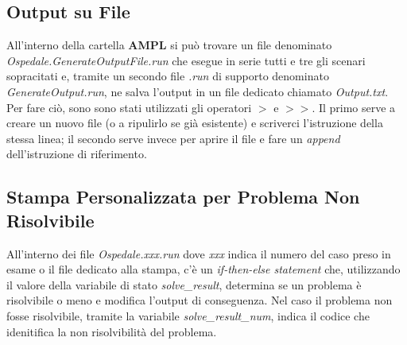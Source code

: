 \subsection{Output su File}
All'interno della cartella \textbf{AMPL} si può trovare un file denominato \textit{Ospedale.GenerateOutputFile.run} che esegue in serie tutti e tre gli scenari sopracitati e, tramite un secondo file \textit{.run} di supporto denominato \textit{GenerateOutput.run}, ne salva l'output in un file dedicato chiamato \textit{Output.txt}.
Per fare ciò, sono sono stati utilizzati gli operatori $>$ e $>>$. Il primo serve a creare un nuovo file (o a ripulirlo se già esistente) e scriverci l'istruzione della stessa linea; il secondo serve invece per aprire il file e fare un \textit{append} dell'istruzione di riferimento.

\subsection{Stampa Personalizzata per Problema Non Risolvibile}
All'interno dei file \textit{Ospedale.xxx.run} dove \textit{xxx} indica il numero del caso preso in esame o il file dedicato alla stampa, c'è un \textit{if-then-else statement} che, utilizzando il valore della variabile di stato \textit{solve\_result}, determina se un problema è risolvibile o meno e modifica l'output di conseguenza. Nel caso il problema non fosse risolvibile, tramite la variabile \textit{solve\_result\_num}, indica il codice che idenitifica la non risolvibilità del problema.